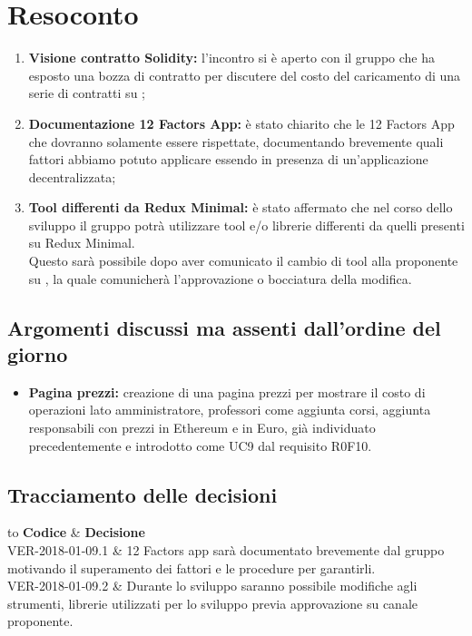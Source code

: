 \documentclass[VER-2018-01-09.tex]{subfiles}
\begin{document}
\chapter{Resoconto}
\begin{enumerate}
	\item \textbf{Visione contratto Solidity:} l'incontro si è aperto con il gruppo \gruppo che ha esposto una bozza di contratto  per discutere del costo del caricamento di una serie di contratti su  ;
	
	\item \textbf{Documentazione 12 Factors App:} è stato chiarito che le 12 Factors App che dovranno solamente essere rispettate, documentando brevemente quali fattori abbiamo potuto applicare essendo in presenza di un'applicazione decentralizzata;
	
	\item \textbf{Tool differenti da Redux Minimal:} è stato affermato che nel corso dello sviluppo il gruppo potrà utilizzare tool e/o librerie differenti da quelli presenti su Redux Minimal.\\
	Questo sarà possibile dopo aver comunicato il cambio di tool alla proponente su , la quale comunicherà l'approvazione o bocciatura della modifica.
\end{enumerate}
\section{Argomenti discussi ma assenti dall'ordine del giorno}
\begin{itemize}
	\item \textbf{Pagina prezzi:} creazione di una pagina prezzi per mostrare il costo di operazioni lato amministratore, professori come aggiunta corsi, aggiunta responsabili con prezzi in Ethereum e in Euro, già individuato precedentemente e introdotto come UC9 dal requisito R0F10.
\end{itemize}
\section{Tracciamento delle decisioni}
\begin{table}[H]
	\begin{center}
		\begin{tabu} to 
			\tableHeaderStyle
			\textbf{Codice} & \textbf{Decisione} \\
			VER-2018-01-09.1 & 12 Factors app sarà documentato brevemente dal gruppo motivando il superamento dei fattori e le procedure per garantirli. \\
			VER-2018-01-09.2 & Durante lo sviluppo saranno possibile modifiche agli strumenti, librerie utilizzati per lo sviluppo previa approvazione su canale  proponente. \\
		\end{tabu}
	\caption{Tracciamento delle decisioni del verbale}
	\end{center}
\end{table}
\end{document}
